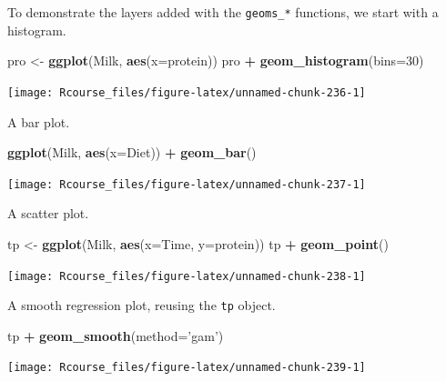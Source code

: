 \documentclass[]{book}
\newenvironment{Shaded}{\begin{snugshade}}{\end{snugshade}}
\newcommand{\KeywordTok}[1]{\textcolor[rgb]{0.13,0.29,0.53}{\textbf{#1}}}
\newcommand{\DataTypeTok}[1]{\textcolor[rgb]{0.13,0.29,0.53}{#1}}
\newcommand{\DecValTok}[1]{\textcolor[rgb]{0.00,0.00,0.81}{#1}}
\newcommand{\StringTok}[1]{\textcolor[rgb]{0.31,0.60,0.02}{#1}}
\newcommand{\OperatorTok}[1]{\textcolor[rgb]{0.81,0.36,0.00}{\textbf{#1}}}
\newcommand{\NormalTok}[1]{#1}
\theoremstyle{definition}
\theoremstyle{definition}
\theoremstyle{definition}
\theoremstyle{remark}
\begin{document}
To demonstrate the layers added with the \texttt{geoms\_*} functions, we
start with a histogram.

\begin{Shaded}
\begin{Highlighting}[]
\NormalTok{pro <-}\StringTok{ }\KeywordTok{ggplot}\NormalTok{(Milk, }\KeywordTok{aes}\NormalTok{(}\DataTypeTok{x=}\NormalTok{protein))}
\NormalTok{pro }\OperatorTok{+}\StringTok{ }\KeywordTok{geom_histogram}\NormalTok{(}\DataTypeTok{bins=}\DecValTok{30}\NormalTok{)}
\end{Highlighting}
\end{Shaded}

\texttt{[image: Rcourse\_files/figure-latex/unnamed-chunk-236-1]}

A bar plot.

\begin{Shaded}
\begin{Highlighting}[]
\KeywordTok{ggplot}\NormalTok{(Milk, }\KeywordTok{aes}\NormalTok{(}\DataTypeTok{x=}\NormalTok{Diet)) }\OperatorTok{+}
\StringTok{  }\KeywordTok{geom_bar}\NormalTok{()}
\end{Highlighting}
\end{Shaded}

\texttt{[image: Rcourse\_files/figure-latex/unnamed-chunk-237-1]}

A scatter plot.

\begin{Shaded}
\begin{Highlighting}[]
\NormalTok{tp <-}\StringTok{ }\KeywordTok{ggplot}\NormalTok{(Milk, }\KeywordTok{aes}\NormalTok{(}\DataTypeTok{x=}\NormalTok{Time, }\DataTypeTok{y=}\NormalTok{protein))}
\NormalTok{tp }\OperatorTok{+}\StringTok{ }\KeywordTok{geom_point}\NormalTok{()}
\end{Highlighting}
\end{Shaded}

\texttt{[image: Rcourse\_files/figure-latex/unnamed-chunk-238-1]}

A smooth regression plot, reusing the \texttt{tp} object.

\begin{Shaded}
\begin{Highlighting}[]
\NormalTok{tp }\OperatorTok{+}\StringTok{ }\KeywordTok{geom_smooth}\NormalTok{(}\DataTypeTok{method=}\StringTok{'gam'}\NormalTok{)}
\end{Highlighting}
\end{Shaded}

\texttt{[image: Rcourse\_files/figure-latex/unnamed-chunk-239-1]}
\end{document}
